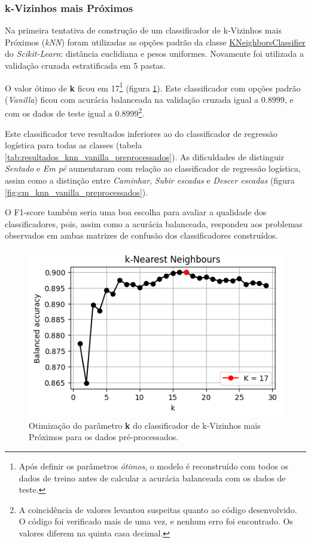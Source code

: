 \documentclass[final,5p]{elsarticle}
\numberwithin{equation}{section}
\begin{document}
    \subsubsection{k-Vizinhos mais Próximos}

        Na primeira tentativa de construção de um classificador de k-Vizinhos mais Próximos (\emph{kNN}) foram utilizadas as opções padrão da classe \href{https://scikit-learn.org/stable/modules/generated/sklearn.neighbors.KNeighborsClassifier.html}{KNeighborsClassifier} do \emph{Scikit-Learn}: distância euclidiana e pesos uniformes. Novamente foi utilizada a validação cruzada estratificada em 5 pastas.

        O valor ótimo de \textbf{k} ficou em 17\footnote{Após definir os parâmetros \emph{ótimos}, o modelo é reconstruído com todos os dados de treino antes de calcular a acurácia balanceada com os dados de teste.} (figura \ref{fig:knn_melhor_k_preprocessados}). Este classificador com opções padrão (\emph{Vanilla}) ficou com acurácia balanceada na validação cruzada igual a $0.8999$, e com os dados de teste igual a $0.8999$\footnote{A coincidência de valores levantou suspeitas quanto ao código desenvolvido. O código foi verificado mais de uma vez, e nenhum erro foi encontrado. Os valores diferem na quinta casa decimal.}.

        Este classificador teve resultados inferiores ao do classificador de regressão logística para todas as classes (tabela \ref{tab:resultados_knn_vanilla_preprocessados}). As dificuldades de distinguir \emph{Sentado} e \emph{Em pé} aumentaram com relação ao classificador de regressão logística, assim como a distinção entre \emph{Caminhar}, \emph{Subir escadas} e \emph{Descer escadas} (figura \ref{fig:cm_knn_vanilla_preprocessados}).

        O F1-score também seria uma boa escolha para avaliar a qualidade dos classificadores, pois, assim como a acurácia balanceada, respondeu aos problemas observados em ambas matrizes de confusão dos classificadores construídos.

        \begin{figure}[hbt!]
            \includegraphics[width=0.95\columnwidth]{A_kNN_bestK.png}
            \caption{Otimização do parâmetro \textbf{k} do classificador de k-Vizinhos mais Próximos para os dados pré-processados.}
            \label{fig:knn_melhor_k_preprocessados}
        \end{figure}
\end{document}
